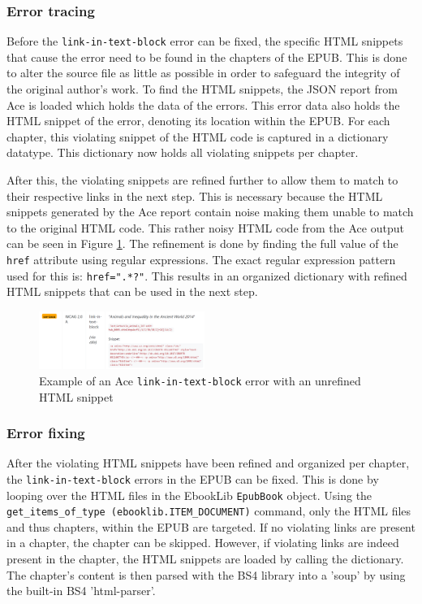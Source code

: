 \subsubsection{Error tracing}
Before the \texttt{link-in-text-block} error can be fixed, the specific HTML snippets that cause the error need to be found in the chapters of the EPUB. This is done to alter the source file as little as possible in order to safeguard the integrity of the original author's work. To find the HTML snippets, the JSON report from Ace is loaded which holds the data of the errors. This error data also holds the HTML snippet of the error, denoting its location within the EPUB. For each chapter, this violating snippet of the HTML code is captured in a dictionary datatype. This dictionary now holds all violating snippets per chapter.

After this, the violating snippets are refined further to allow them to match to their respective links in the next step. This is necessary because the HTML snippets generated by the Ace report contain noise making them unable to match to the original HTML code. This rather noisy HTML code from the Ace output can be seen in Figure \ref{figure:aceexample}. The refinement is done by finding the full value of the \texttt{href} attribute using regular expressions. The exact regular expression pattern used for this is: \texttt{href=".*?"}. This results in an organized dictionary with refined HTML snippets that can be used in the next step.


\begin{figure}[h!]
\includegraphics[width=0.48\textwidth,keepaspectratio]{media/images/aceexample.png}
\caption{Example of an Ace \texttt{link-in-text-block} error with an unrefined HTML snippet}
\centering
\label{figure:aceexample}
\end{figure}


\subsubsection{Error fixing}
After the violating HTML snippets have been refined and organized per chapter, the \texttt{link-in-text-block} errors in the EPUB can be fixed. This is done by looping over the HTML files in the EbookLib \texttt{EpubBook} object. Using the \texttt{get\_items\_of\_type
(ebooklib.ITEM\_DOCUMENT)} command, only the HTML files and thus chapters, within the EPUB are targeted. If no violating links are present in a chapter, the chapter can be skipped. However, if violating links are indeed present in the chapter, the HTML snippets are loaded by calling the dictionary. The chapter's content is then parsed with the BS4 library into a 'soup' by using the built-in BS4 'html-parser'.

